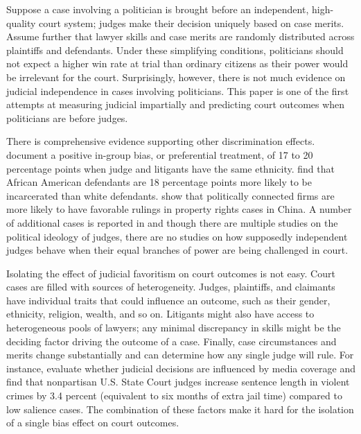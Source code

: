 \documentclass[11pt]{article}
\begin{document}
Suppose a case involving a politician is brought before an independent, high-quality court system; judges make their decision uniquely based on case merits. Assume further that lawyer skills and case merits are randomly distributed across plaintiffs and defendants. Under these simplifying conditions, politicians should not expect a higher win rate at trial than ordinary citizens as their power would be irrelevant for the court. Surprisingly, however, there is not much evidence on judicial independence in cases involving politicians. This paper is one of the first attempts at measuring judicial impartially and predicting court outcomes when politicians are before judges.

There is comprehensive evidence supporting other discrimination effects. \citet{ShayoJudicialIngroupBias2011} document a positive in-group bias, or preferential treatment, of 17 to 20 percentage points when judge and litigants have the same ethnicity. \citet{AbramsJudgesVaryTheir2012} find that African American defendants are 18 percentage points more likely to be incarcerated than white defendants. \citet{LuPoliticalConnectednessCourt2015} show that politically connected firms are more likely to have favorable rulings in property rights cases in China. A number of additional cases is reported in \citet{RachlinskiJudgingJudiciaryNumbers2017} and though there are multiple studies on the political ideology of judges, there are no studies on how supposedly independent judges behave when their equal branches of power are being challenged in court.

Isolating the effect of judicial favoritism on court outcomes is not easy. Court cases are filled with sources of heterogeneity. Judges, plaintiffs, and claimants have individual traits that could influence an outcome, such as their gender, ethnicity, religion, wealth, and so on. Litigants might also have access to heterogeneous pools of lawyers; any minimal discrepancy in skills might be the deciding factor driving the outcome of a case. Finally, case circumstances and merits change substantially and can determine how any single judge will rule. For instance, \citet{LimJudgePoliticianPress2015} evaluate whether judicial decisions are influenced by media coverage and find that nonpartisan U.S. State Court judges increase sentence length in violent crimes by 3.4 percent (equivalent to six months of extra jail time) compared to low salience cases. The combination of these factors make it hard for the isolation of a single bias effect on court outcomes.
\end{document}
